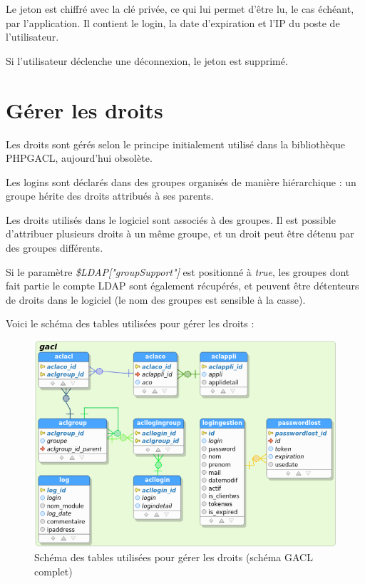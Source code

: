 Le jeton est chiffré avec la clé privée, ce qui lui permet d'être lu, le cas échéant, par l'application. Il contient le login, la date d'expiration et l'IP du poste de l'utilisateur. 

Si l'utilisateur déclenche une déconnexion, le jeton est supprimé.

\section{Gérer les droits}

Les droits sont gérés selon le principe initialement utilisé dans la bibliothèque PHPGACL, aujourd'hui obsolète. 

Les logins sont déclarés dans des groupes organisés de manière hiérarchique : un groupe hérite des droits attribués à ses parents.

Les droits utilisés dans le logiciel sont associés à des groupes. Il est possible d'attribuer plusieurs droits à un même groupe, et un droit peut être détenu par des groupes différents.

Si le paramètre \textit{\$LDAP["groupSupport"]} est positionné à \textit{true}, les groupes dont fait partie le compte LDAP sont également récupérés, et peuvent être détenteurs de droits dans le logiciel (le nom des groupes est sensible à la casse).

Voici le schéma des tables utilisées pour gérer les droits :

\begin{figure}[H]
\includegraphics[width=\linewidth]{dessin/gacl}
\caption{Schéma des tables utilisées pour gérer les droits (schéma GACL complet)}
\end{figure}

